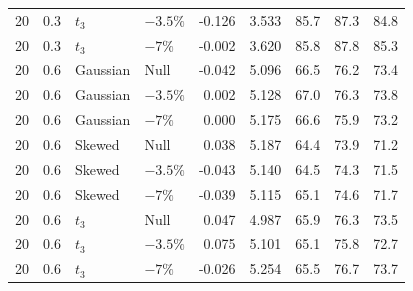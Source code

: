 \begin{table}[H]
\begin{tabular*}{\textwidth}{@{\extracolsep{\fill}}rrllrrrrr}
20 & 0.3 & $t_3$ & $-3.5\%$ & -0.126 & 3.533 & 85.7 & 87.3 & 84.8 \\
20 & 0.3 & $t_3$ & $-7\%$ & -0.002 & 3.620 & 85.8 & 87.8 & 85.3 \\
20 & 0.6 & Gaussian & Null & -0.042 & 5.096 & 66.5 & 76.2 & 73.4 \\
20 & 0.6 & Gaussian & $-3.5\%$ & 0.002 & 5.128 & 67.0 & 76.3 & 73.8 \\
20 & 0.6 & Gaussian & $-7\%$ & 0.000 & 5.175 & 66.6 & 75.9 & 73.2 \\
20 & 0.6 & Skewed & Null & 0.038 & 5.187 & 64.4 & 73.9 & 71.2 \\
20 & 0.6 & Skewed & $-3.5\%$ & -0.043 & 5.140 & 64.5 & 74.3 & 71.5 \\
20 & 0.6 & Skewed & $-7\%$ & -0.039 & 5.115 & 65.1 & 74.6 & 71.7 \\
20 & 0.6 & $t_3$ & Null & 0.047 & 4.987 & 65.9 & 76.3 & 73.5 \\
20 & 0.6 & $t_3$ & $-3.5\%$ & 0.075 & 5.101 & 65.1 & 75.8 & 72.7 \\
20 & 0.6 & $t_3$ & $-7\%$ & -0.026 & 5.254 & 65.5 & 76.7 & 73.7 \\
\bottomrule
\end{tabular*}
\end{table}

